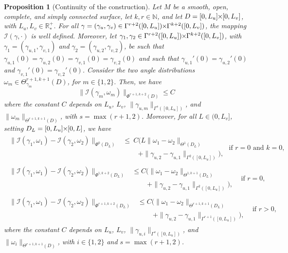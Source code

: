 \documentclass{article}
\newcommand{\I}{\mathcal{I}}
\newcommand{\PLH}{{\mkern-1mu\times\mkern-1mu}}
\newcommand{\Times}{\PLH}
\newcommand{\R}{\mathbb{R}}
\newcommand{\surf}{M}
\newcommand{\EN}{\mathbb{N}}
\newtheorem{proposition}[theorem]{Proposition}
\theoremstyle{remark}
\theoremstyle{prpart}
\begin{document}
\begin{proposition}[Continuity of the construction]\label{prop:cont-I}
Let $\surf$ be a smooth, open, complete, and simply connected surface, let $k,r\in\EN$, and let $D=[0,L_u]\Times[0,L_v]$, with $L_u,L_v\in\R^+_\ast$. For all $\gamma=(\gamma_u,\gamma_v)\in\Gamma^{r+2}([0,L_u])\Times\Gamma^{k+2}([0,L_v])$, the mapping $\I(\gamma,\cdot)$ is well defined. Moreover, let \sloppy $\gamma_1,\gamma_2\in\Gamma^{r+2}([0,L_u])\Times\Gamma^{k+2}([0,L_v])$, with $\gamma_1=(\gamma_{u,1}, \gamma_{v,1})$ and $\gamma_2=(\gamma_{u,2}, \gamma_{v,2})$, be such that $\gamma_{u,1}(0)=\gamma_{u,2}(0) = \gamma_{v,1}(0)=\gamma_{v,2}(0)$ and such that $\gamma_{u,1}'(0)=\gamma_{u,2}'(0)$ and $\gamma_{v,1}'(0)=\gamma_{v,2}'(0)$. Consider the two angle distributions $\omega_m\in \Theta^{r+1,k+1}_{\gamma_m}(D)$, for $m\in\{1,2\}$. Then, we have
\begin{equation}\label{eq:contr-I}
  \|\I(\gamma_m,\omega_m)\|_{\Phi^{r+1,k+2}(D)} \leq C%
\end{equation}
where the constant $C$ depends on $L_u$, $L_v$, $\|\gamma_{u,m}\|_{\Gamma^{s}([0,L_u])}$, and $\|\omega_m\|_{\Theta^{r+1,k+1}(D)}$, with $s=\max(r+1,2)$.
Moreover, for all $L\in(0,L_v]$, setting $D_L=[0,L_u]\Times[0,L]$, we have
\small
\begin{subequations}\label{eq:cont-I}
\begin{align}\label{eq:cont-I1}
\begin{split}
  \|\I(\gamma_1,\omega_1) - \I(\gamma_2,\omega_2)\|_{\Phi^{0}(D_L)} &\leq ~C\Big(L\|\omega_1 - \omega_2\|_{\Theta^{1}(D_L)}\\
 &\qquad~+ \|\gamma_{u,2}-\gamma_{u,1}\|_{\Gamma^{2}([0,L_u])}\Big),
\end{split} \text{ if $r=0$ and $k=0$},\\\label{eq:cont-I2}
\begin{split}
  \|\I(\gamma_1,\omega_1) - \I(\gamma_2,\omega_2)\|_{\Phi^{1,k+2}(D_L)} &\leq C\Big(\|\omega_1 - \omega_2\|_{\Theta^{1,k+1}(D_L)}\\
 &\qquad~+ \|\gamma_{u,2}-\gamma_{u,1}\|_{\Gamma^{2}([0,L_u])}\Big),
\end{split}~~ \text{ if } r=0,\\\label{eq:cont-I3}
\begin{split}
  \|\I(\gamma_1,\omega_1) - \I(\gamma_2,\omega_2)\|_{\Phi^{r+1,k+2}(D_L)} &\leq C\Big(\|\omega_1 - \omega_2\|_{\Theta^{r+1,k+1}(D_L)}\\
 &\qquad~+ \|\gamma_{u,2}-\gamma_{u,1}\|_{\Gamma^{r+1}([0,L_u])}\Big),
\end{split} ~~\text{ if } r>0,
\end{align}
\end{subequations}
\normalsize
where the constant $C$ depends on $L_u$, $L_v$, $\|\gamma_{u,i}\|_{\Gamma^{s}([0,L_u])}$, and $\|\omega_i\|_{\Theta^{r+1,k+1}(D)}$, with $i\in\{1,2\}$ and $s=\max(r+1,2)$.
\end{proposition}
\end{document}
